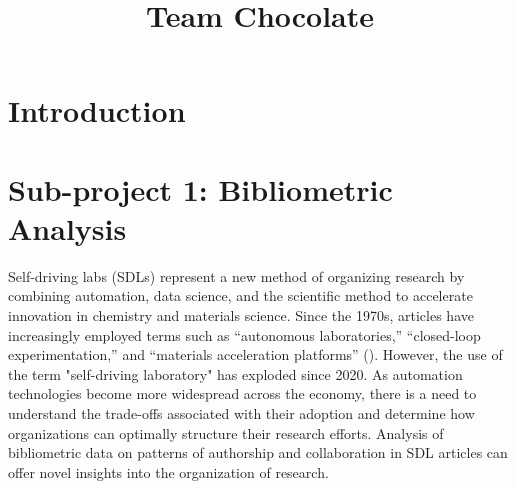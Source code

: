 \documentclass{article}
\title{Team Chocolate}
\begin{document}
\maketitle




\section{Introduction}

\section{Sub-project 1: Bibliometric Analysis}

Self-driving labs (SDLs) represent a new method of organizing research by combining automation, data science, and the scientific method to accelerate innovation in chemistry and materials science. Since the 1970s, articles have increasingly employed terms such as “autonomous laboratories,” “closed-loop experimentation,” and “materials acceleration platforms” (\cite{sterling2024}). However, the use of the term "self-driving laboratory" has exploded since 2020. As automation technologies become more widespread across the economy, there is a need to understand the trade-offs associated with their adoption and determine how organizations can optimally structure their research efforts. Analysis of bibliometric data on patterns of authorship and collaboration in SDL articles can offer novel insights into the organization of research.
\end{document}
